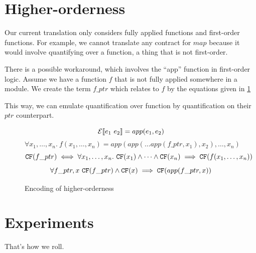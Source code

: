 \documentclass[preprint]{sigplanconf}
\begin{document}
\section{Higher-orderness}
\label{ho}
Our current translation only considers fully applied functions and
first-order functions. For example, we cannot translate any contract
for $map$ because it would involve quantifying over a function, a
thing that is not first-order.

There is a possible workaround, which involves the ``app'' function in
first-order logic. Assume we have a function $f$ that is not fully
applied somewhere in a module. We create the term $f\_ptr$ which
relates to $f$ by the equations given in \ref{ho-fig}

This way, we can emulate quantification over function by
quantification on their $ptr$ counterpart.


\begin{figure}
\label{ho-fig}
$$\mathcal{E} \llbracket e_1~e_2 \rrbracket = app(e_1,e_2)$$
$$ \forall x_1,\dots,x_n.~f(x_1,\dots,x_n) = app(app(\dots app(f\_ptr,x_1),x_2),\dots,x_n)$$
$$ \texttt{CF}(f\_ptr) \iff \forall x_1,\dots,x_n.~\texttt{CF}(x_1) \land \dots \land \texttt{CF}(x_n) \implies \texttt{CF}(f(x_1,\dots,x_n))$$
$$\forall f\_ptr,x~\texttt{CF}(f\_ptr) \land \texttt{CF}(x) \implies \texttt{CF}(app(f\_ptr,x))$$
\caption{Encoding of higher-orderness}
\end{figure}

\section{Experiments}
That's how we roll.
\end{document}

